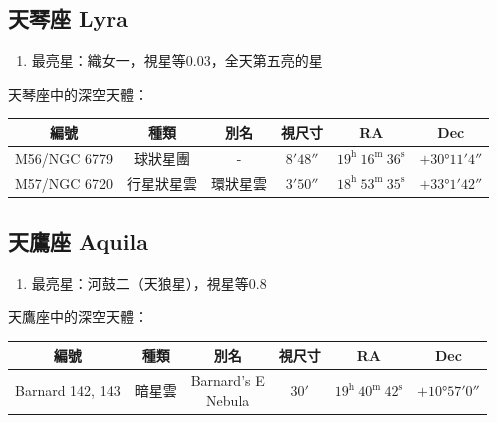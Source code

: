 \subsection{天琴座 Lyra}
\begin{enumerate}
    \item 最亮星：織女一，視星等0.03，全天第五亮的星
\end{enumerate}
天琴座中的深空天體：
\newline

\begin{center}
\begin{longtable}{c | c | c | c | c | c}
    編號 & 種類 & 別名 & 視尺寸 & RA & Dec \\
    \hline
    \endfirsthead


    \endfoot

    \endlastfoot

    M56/NGC 6779 & 球狀星團 & - & \(\ang{;8;48}\) & \(19^\text{h }16^\text{m }36^\text{s}\) & \(+\ang{30;11;4}\) \\ %
    M57/NGC 6720 & 行星狀星雲 & 環狀星雲 & \(\ang{;3;50}\) & \(18^\text{h }53^\text{m }35^\text{s}\) & \(+\ang{33;1;42}\) \\ %
\end{longtable}
\end{center}

\subsection{天鷹座 Aquila}
\begin{enumerate}
    \item 最亮星：河鼓二（天狼星），視星等0.8
\end{enumerate}
天鷹座中的深空天體：

\begin{center}
\begin{longtable}{c | c | c | c | c | c}
    編號 & 種類 & 別名 & 視尺寸 & RA & Dec \\
    \hline
    \endfirsthead


    \endfoot

    \endlastfoot

    Barnard 142, 143 & 暗星雲 & \makecell{Barnard's E\\Nebula} & \(\ang{;30;}\) & \(19^\text{h }40^\text{m }42^\text{s}\) & \(+\ang{10;57;0}\) \\ %
\end{longtable}
\end{center}

